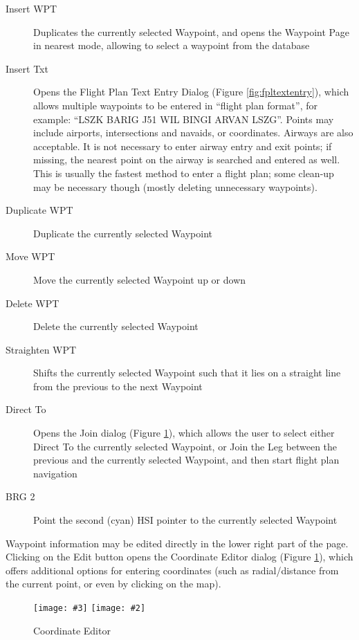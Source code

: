 \documentclass[a4paper,10pt,pdftex]{article}
\newcommand{\jnxfig}[3][]{\ifmypdf\texttt{[image: \#3]}
  \else\texttt{[image: \#2]}\fi}
\begin{document}
\begin{description}
\item[Insert WPT] Duplicates the currently selected Waypoint, and
  opens the Waypoint Page in nearest mode, allowing to select a
  waypoint from the database
\item[Insert Txt] Opens the Flight Plan Text Entry Dialog (Figure
  \ref{fig:fpltextentry}), which allows multiple waypoints to be
  entered in ``flight plan format'', for example: ``LSZK BARIG J51 WIL
  BINGI ARVAN LSZG''. Points may include airports, intersections and
  navaids, or coordinates. Airways are also acceptable. It is not
  necessary to enter airway entry and exit points; if missing, the
  nearest point on the airway is searched and entered as well. This is
  usually the fastest method to enter a flight plan; some clean-up may
  be necessary though (mostly deleting unnecessary waypoints).
\item[Duplicate WPT] Duplicate the currently selected Waypoint
\item[Move WPT] Move the currently selected Waypoint up or down
\item[Delete WPT] Delete the currently selected Waypoint
\item[Straighten WPT] Shifts the currently selected Waypoint such that
  it lies on a straight line from the previous to the next Waypoint
\item[Direct To] Opens the Join dialog (Figure \ref{fig:coordeditor}),
  which allows the user to select either Direct To the currently
  selected Waypoint, or Join the Leg between the previous and the
  currently selected Waypoint, and then start flight plan navigation
\item[BRG 2] Point the second (cyan) HSI pointer to the currently
  selected Waypoint
\end{description}

Waypoint information may be edited directly in the lower right part of
the page. Clicking on the Edit button opens the Coordinate Editor
dialog (Figure \ref{fig:coordeditor}), which offers additional options
for entering coordinates (such as radial/distance from the current
point, or even by clicking on the map).

\begin{figure}[!htbp]
  \begin{center}
    \jnxfig[scale=0.5]{coordeditor.eps}{coordeditor.png}
    \caption{Coordinate Editor}
    \label{fig:coordeditor}
  \end{center}
\end{figure}
\end{document}
